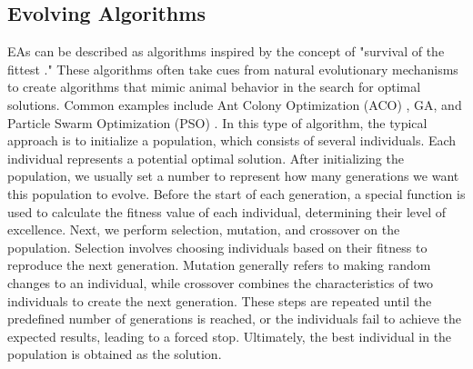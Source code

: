 \begin{ZhChapter}
    \subsection{Evolving Algorithms}
    EAs can be described as algorithms inspired by the concept of "survival of the fittest \cite{paul1988selection}." These algorithms often take cues from natural evolutionary mechanisms to create algorithms that mimic animal behavior in the search for optimal solutions. Common examples include Ant Colony Optimization (ACO) \cite{dorigo2006ant}, GA, and Particle Swarm Optimization (PSO) \cite{kennedy1995particle}. In this type of algorithm, the typical approach is to initialize a population, which consists of several individuals. Each individual represents a potential optimal solution. After initializing the population, we usually set a number to represent how many generations we want this population to evolve. Before the start of each generation, a special function is used to calculate the fitness value of each individual, determining their level of excellence. Next, we perform selection, mutation, and crossover on the population. Selection involves choosing individuals based on their fitness to reproduce the next generation. Mutation generally refers to making random changes to an individual, while crossover combines the characteristics of two individuals to create the next generation. These steps are repeated until the predefined number of generations is reached, or the individuals fail to achieve the expected results, leading to a forced stop. Ultimately, the best individual in the population is obtained as the solution.


\end{ZhChapter}
